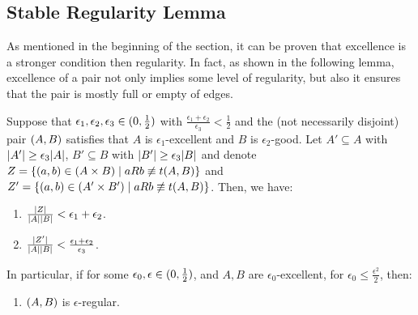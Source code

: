 
    \subsection{Stable Regularity Lemma} \label{subsec:subsection_5.3}

        As mentioned in the beginning of the section, it can be proven that excellence is a stronger condition then
        regularity.
        In fact, as shown in the following lemma, excellence of a pair not only implies some level of regularity, but
        also it ensures that the pair is mostly full or empty of edges.

        \begin{lemma}[Lemma 5.17] \label{lem:excellence_implies_regularity}
            Suppose that $\epsilon_1, \epsilon_2, \epsilon_3 \in ( 0, \frac{1}{2} )$ with
            $\frac{\epsilon_1 + \epsilon_2}{\epsilon_3} < \frac{1}{2}$ and the (not necessarily disjoint) pair $( A,B )$ satisfies that
            $A$ is $\epsilon_1$-excellent and $B$ is $\epsilon_2$-good.
            Let $A' \subseteq A$ with $| A' | \geq \epsilon_3 | A |$,
            $B' \subseteq B$ with $| B' | \geq \epsilon_3 | B |$ and
            denote $Z = \{ ( a,b ) \in ( A \times B ) \mid a R b \not\equiv t( A,B ) \}$ and
            $Z' = \{ ( a,b ) \in ( A' \times B' ) \mid a R b \not\equiv t( A,B ) \}$.
            Then, we have:
            \begin{enumerate}
                \item \label{itm:excellence_implies_regularity.1} $\frac{| Z |}{{| A | | B |}} < \epsilon_1 + \epsilon_2$.
                \item \label{itm:excellence_implies_regularity.2} $\frac{| Z' |}{| A | | B |} <
                    \frac{\epsilon_1 + \epsilon_2}{\epsilon_3}$.
            \end{enumerate}
            In particular, if for some $\epsilon_0, \epsilon \in ( 0, \frac{1}{2} )$, and $A, B$ are $\epsilon_0$-excellent,
            for $\epsilon_0 \leq \frac{\epsilon^2}{2}$, then:
            \begin{enumerate}[label=\alph*., ref=\alph*]
                \item \label{itm:excellence_implies_regularity.a} $( A,B )$ is $\epsilon$-regular.

\end{enumerate}
\end{lemma}
